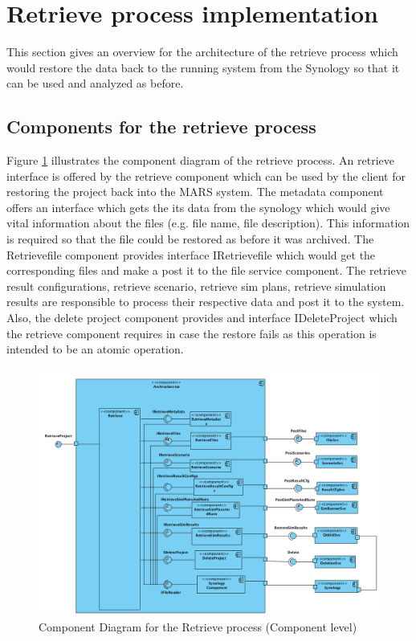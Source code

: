 \section{Retrieve process implementation}
This section gives an overview for the architecture of the retrieve process which would restore the data back to the running
system from the Synology so that it can be used and analyzed as before.

\subsection{Components for the retrieve process}
 Figure \ref{fig:restore} illustrates the component diagram of the retrieve process. An retrieve interface is offered by the retrieve component which can be used by
 the client for restoring the project back into the MARS system. The metadata component offers an interface which gets the its data from the synology which 
 would give vital information about the files (e.g. file name, file description). This information is required so that the file could be restored as before it was
 archived. The Retrievefile component provides interface IRetrievefile which would get the corresponding files and make a post it to the file service component. The
 retrieve result configurations, retrieve scenario, retrieve sim plans, retrieve simulation results are responsible to process their respective data and post it to the
 system. Also, the delete project component provides and interface IDeleteProject which the retrieve component requires in case the restore fails as this operation
 is intended to be an atomic operation.

\begin{figure}[H]
    \centering \includegraphics[scale=0.4]{grafiken/restoreComponent.png}
    \caption{Component Diagram for the Retrieve process (Component level)}
    \label{fig:restore}
\end{figure}


